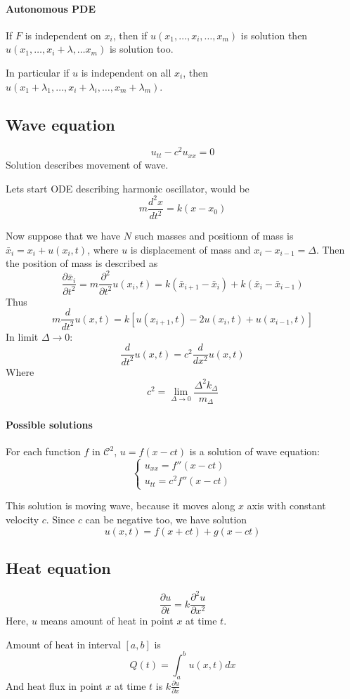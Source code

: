 \paragraph{Autonomous PDE } If $F$ is independent on $x_i$, then if $u(x_1, \dots, x_i, \dots, x_m)$ is solution then $u(x_1, \dots, x_i+\lambda, \dots x_m)$ is solution too. 

In particular if $u$ is independent on all $x_i$, then $u(x_1+\lambda_1, \dots, x_i+\lambda_i, \dots, x_m+\lambda_m)$.

\subsection{Wave equation}
$$u_{tt} - c^2 u_{xx} = 0$$
Solution describes movement of wave.

Lets start ODE describing harmonic oscillator, would be
$$m \frac{d^2x}{dt^2} = k(x - x_0)$$

Now suppose that we have $N$ such masses and positionn of mass is $\bar{x}_i = x_i+u(x_i, t)$, where $u$ is displacement of mass and $x_i - x_{i-1} = \Delta$. Then the position of mass is described as
$$\frac{\partial \bar{x}_i}{\partial t^2} = m\frac{\partial^2 }{\partial t^2}u(x_i,t) = k(\bar{x}_{i+1}-\bar{x}_i)+k(\bar{x}_{i}-\bar{x}_{i-1})$$
Thus
$$m\frac{d}{dt^2}u(x,t) = k \left[ u(x_{i+1},t) - 2u(x_i,t) + u(x_{i-1},t) \right]$$
In limit $\Delta \to 0$:
$$\frac{d}{dt^2}u(x,t) = c^2\frac{d}{dx^2}u(x,t)$$
Where
$$c^2 = \lim_{\Delta \to 0} \frac{\Delta^2 k_\Delta}{m_\Delta} $$
\paragraph{Possible solutions}
For each function $f$ in $\mathcal{C}^2$, $u=f(x-ct)$ is a solution of wave equation:
$$\begin{cases}
u_{xx} = f''(x-ct)\\
u_{tt} = c^2 f''(x-ct)
\end{cases}$$

This solution is moving wave, because it moves along $x$ axis with constant velocity $c$. Since $c$ can be negative too, we have solution
$$u(x,t) = f(x+ct) + g(x-ct)$$
\subsection{Heat equation}
$$\frac{\partial u}{\partial t} = k \frac{\partial^2 u}{\partial x^2} $$
Here, $u$ means amount of heat in point $x$ at time $t$.

Amount of heat in interval $[a,b]$ is
$$Q(t) = \int_a^b u(x,t) dx$$
And heat flux in point $x$ at time $t$ is $k\frac{\partial u}{\partial x}$


